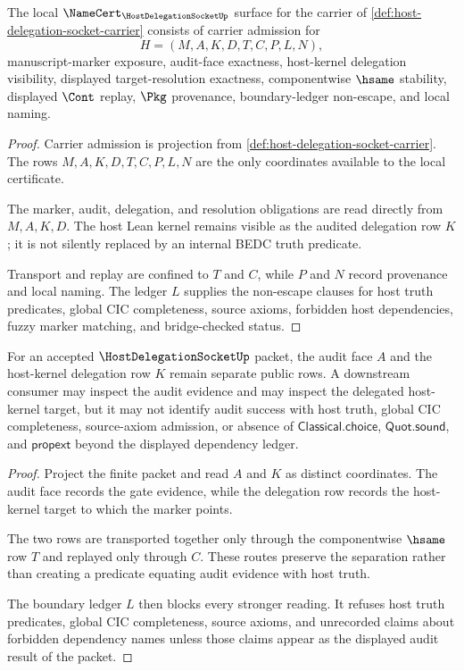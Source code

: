 \begin{theorem}
\label{thm:host-delegation-socket-namecert-obligations}
The local $\NameCert_{\HostDelegationSocketUp}$ surface for the carrier of \autoref{def:host-delegation-socket-carrier} consists of carrier admission for
$$
H=(M,A,K,D,T,C,P,L,N),
$$
manuscript-marker exposure, audit-face exactness, host-kernel delegation visibility, displayed target-resolution exactness, componentwise $\hsame$ stability, displayed $\Cont$ replay, $\Pkg$ provenance, boundary-ledger non-escape, and local naming.
\end{theorem}
\begin{proof}
Carrier admission is projection from \autoref{def:host-delegation-socket-carrier}. The rows $M,A,K,D,T,C,P,L,N$ are the only coordinates available to the local certificate.

The marker, audit, delegation, and resolution obligations are read directly from $M,A,K,D$. The host Lean kernel remains visible as the audited delegation row $K$; it is not silently replaced by an internal BEDC truth predicate.

Transport and replay are confined to $T$ and $C$, while $P$ and $N$ record provenance and local naming. The ledger $L$ supplies the non-escape clauses for host truth predicates, global CIC completeness, source axioms, forbidden host dependencies, fuzzy marker matching, and bridge-checked status.
\end{proof}

\begin{theorem}
\label{thm:host-delegation-socket-audit-face-separation}
For an accepted $\HostDelegationSocketUp$ packet, the audit face $A$ and the host-kernel delegation row $K$ remain separate public rows. A downstream consumer may inspect the audit evidence and may inspect the delegated host-kernel target, but it may not identify audit success with host truth, global CIC completeness, source-axiom admission, or absence of $\mathsf{Classical.choice}$, $\mathsf{Quot.sound}$, and $\mathsf{propext}$ beyond the displayed dependency ledger.
\end{theorem}
\begin{proof}
Project the finite packet and read $A$ and $K$ as distinct coordinates. The audit face records the gate evidence, while the delegation row records the host-kernel target to which the marker points.

The two rows are transported together only through the componentwise $\hsame$ row $T$ and replayed only through $C$. These routes preserve the separation rather than creating a predicate equating audit evidence with host truth.

The boundary ledger $L$ then blocks every stronger reading. It refuses host truth predicates, global CIC completeness, source axioms, and unrecorded claims about forbidden dependency names unless those claims appear as the displayed audit result of the packet.
\end{proof}

